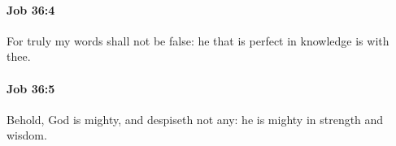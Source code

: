 		\paragraph{Job 36:4} %
			\label{JOB-36-4}

			For truly my words shall not be false: he that is perfect in knowledge is with thee.


		\paragraph{Job 36:5} %
			\label{JOB-36-5}

			Behold, God is mighty, and despiseth not any: he is mighty in strength and wisdom.


